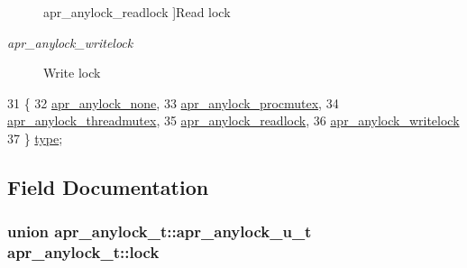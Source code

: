 \begin{Desc}
\begin{description}
{apr\+\_\+anylock\+\_\+readlock\hypertarget{structapr__anylock__t_a047e5c4d930f359618a96fd5e857f851a764d57b3fda600d8b891bef6128d02b5}{}\label{structapr__anylock__t_a047e5c4d930f359618a96fd5e857f851a764d57b3fda600d8b891bef6128d02b5}
}]Read lock \item[{\em 
apr\+\_\+anylock\+\_\+writelock\hypertarget{structapr__anylock__t_a047e5c4d930f359618a96fd5e857f851a865d43ac3a9bb62f942e4e85b0befbda}{}\label{structapr__anylock__t_a047e5c4d930f359618a96fd5e857f851a865d43ac3a9bb62f942e4e85b0befbda}
}]Write lock \end{description}
\end{Desc}

\begin{DoxyCode}
31                  \{
32         \hyperlink{structapr__anylock__t_a047e5c4d930f359618a96fd5e857f851aa538eef19ecc0576a84344a5191abbd8}{apr\_anylock\_none},           
33         \hyperlink{structapr__anylock__t_a047e5c4d930f359618a96fd5e857f851a441c78d4b9f1ed5620a3f7f3195ca9d7}{apr\_anylock\_procmutex},      
34         \hyperlink{structapr__anylock__t_a047e5c4d930f359618a96fd5e857f851ad68c4c27cf2b58cabca43d35890045b6}{apr\_anylock\_threadmutex},    
35         \hyperlink{structapr__anylock__t_a047e5c4d930f359618a96fd5e857f851a764d57b3fda600d8b891bef6128d02b5}{apr\_anylock\_readlock},       
36         \hyperlink{structapr__anylock__t_a047e5c4d930f359618a96fd5e857f851a865d43ac3a9bb62f942e4e85b0befbda}{apr\_anylock\_writelock}       
37     \} \hyperlink{structapr__anylock__t_abe78b2ee0daaee1b19c952c4f8fc903a}{type};
\end{DoxyCode}


\subsection{Field Documentation}
\subsubsection[{\texorpdfstring{lock}{lock}}]{\setlength{\rightskip}{0pt plus 5cm}union {\bf apr\+\_\+anylock\+\_\+t\+::apr\+\_\+anylock\+\_\+u\+\_\+t}  apr\+\_\+anylock\+\_\+t\+::lock}\hypertarget{structapr__anylock__t_a7064f0fcc63ef139e62260dc311687a2}{}\label{structapr__anylock__t_a7064f0fcc63ef139e62260dc311687a2}
